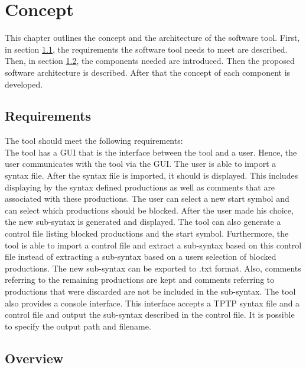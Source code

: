 
\chapter{Concept}\label{cha:Concept}
This chapter outlines the concept and the architecture of the software tool.
First, in section \ref{sec:ConceptRequirements}, the requirements the software tool needs to meet are described.
Then, in section \ref{sec:ConceptOverview}, the components needed are introduced.
Then the proposed software architecture is described. After that the concept of each component is developed.

\section{Requirements}\label{sec:ConceptRequirements}
The tool should meet the following requirements:\\
The tool has a GUI that is the interface between the tool and a user. Hence, the user communicates with the tool via the GUI. The user is able to import a syntax file. After the syntax file is imported, it should is displayed. 
This includes displaying by the syntax defined productions as well as comments that are associated with these productions.
The user can select a new start symbol and can select which productions should be blocked. 
After the user made his choice, the new sub-syntax is generated and displayed.
The tool can also generate a control file listing blocked productions and the start symbol.
Furthermore, the tool is able to import a control file and extract a sub-syntax based on this control file instead of extracting a sub-syntax based on a users selection of blocked productions.
The new sub-syntax can be exported to .txt format.
Also, comments referring to the remaining productions are kept and comments referring to productions that were discarded are not be included in the sub-syntax.
The tool also provides a console interface. This interface accepts a \ac{TPTP} syntax file and a control file and output the sub-syntax described in the control file. It is possible to specify the output path and filename.
\section{Overview}\label{sec:ConceptOverview}

